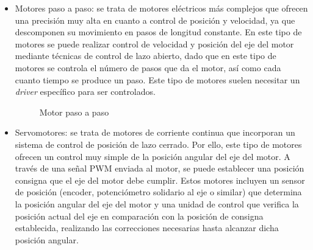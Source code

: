 \begin{itemize}
    \item Motores paso a paso: se trata de motores eléctricos más complejos que ofrecen una precisión muy alta en cuanto a  control de posición y velocidad, ya que descomponen su movimiento en pasos de longitud constante. En este tipo de motores se puede realizar control de velocidad y posición del eje del motor mediante técnicas de control de lazo abierto, dado que en este tipo de motores se controla el número de pasos que da el motor, así como cada cuanto tiempo se produce un paso. Este tipo de motores suelen necesitar un \textit{driver} específico para ser controlados.
    
    \begin{figure}[H]
    \centering
    \caption{Motor paso a paso} \label{fig:lego}
    \end{figure}
  
    \item Servomotores: se trata de motores de corriente continua que incorporan un sistema de control de posición de lazo cerrado. Por ello, este tipo de motores ofrecen un control muy simple de la posición angular del eje del motor. A través de una señal \ac{PWM} enviada al motor, se puede establecer una posición consigna que el eje del motor debe cumplir. Estos motores incluyen un sensor de posición (encoder, potenciómetro solidario al eje o similar) que determina la posición angular del eje del motor y una unidad de control que verifica la posición actual del eje en comparación con la posición de consigna establecida, realizando las correcciones necesarias hasta alcanzar dicha posición angular.
    

\end{itemize}
